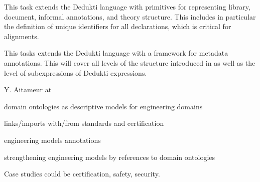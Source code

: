 \begin{workpackage}
\begin{tasklist}
\begin{task}[id=strlibstructure,title=Library Structure,lead=Fau,FauRM=12]
This task extends the Dedukti language with primitives for representing library, document, informal annotations, and theory structure.
This includes in particular the definition of unique identifiers for all declarations, which is critical for alignments.
%
%
\end{task} 

\begin{task}[id=strdofimpl,title=Ontological Framework for Meta-Data,lead=Sac,SacRM=18]
This tasks extends the Dedukti language with a framework for metadata annotations.
This will cover all levels of the structure introduced in  as well as the level of subexpressions of Dedukti expressions.
\end{task} 

\begin{task}[id=strdomonto,title= Domain Ontologies for Formal Methods in SE,lead=Tou,TouRM=12, SacRM=6]
Y. Aitameur at 
\begin{compactitem}
\item domain ontologies as descriptive models for engineering domains 
\item links/imports with/from standards and certification
\item engineering models annotations
\item strengthening engineering models by references to domain ontologies
\item Case studies could be certification, safety, security.
\end{compactitem}
\end{task} 


\end{tasklist}
\end{workpackage}
